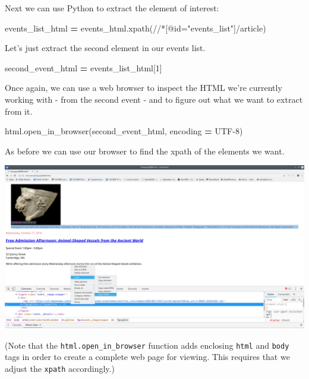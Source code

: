 \documentclass[
]{book}
\newenvironment{Shaded}{\begin{snugshade}}{\end{snugshade}}
\newcommand{\DecValTok}[1]{\textcolor[rgb]{0.00,0.00,0.81}{#1}}
\newcommand{\NormalTok}[1]{#1}
\newcommand{\OperatorTok}[1]{\textcolor[rgb]{0.81,0.36,0.00}{\textbf{#1}}}
\newcommand{\StringTok}[1]{\textcolor[rgb]{0.31,0.60,0.02}{#1}}
\begin{document}
Next we can use Python to extract the element of interest:

\begin{Shaded}
\begin{Highlighting}[]
\NormalTok{events\_list\_html }\OperatorTok{=}\NormalTok{ events\_html.xpath(}\StringTok{\textquotesingle{}//*[@id="events\_list"]/article\textquotesingle{}}\NormalTok{)}
\end{Highlighting}
\end{Shaded}

Let's just extract the second element in our events list.

\begin{Shaded}
\begin{Highlighting}[]
\NormalTok{second\_event\_html }\OperatorTok{=}\NormalTok{ events\_list\_html[}\DecValTok{1}\NormalTok{]}
\end{Highlighting}
\end{Shaded}

Once again, we can use a web browser to inspect the HTML we're currently working with - from the second event - and to figure out what we want to extract from it.

\begin{Shaded}
\begin{Highlighting}[]
\NormalTok{html.open\_in\_browser(second\_event\_html, encoding }\OperatorTok{=} \StringTok{\textquotesingle{}UTF{-}8\textquotesingle{}}\NormalTok{)}
\end{Highlighting}
\end{Shaded}

As before we can use our browser to find the xpath of the elements we want.

\includegraphics{Python/PythonWebScrape/images/dev_tools_figcaption.png}

(Note that the \texttt{html.open\_in\_browser} function adds enclosing \texttt{html} and \texttt{body} tags in order to create a complete web page for viewing. This requires that we adjust the \texttt{xpath} accordingly.)
\end{document}
